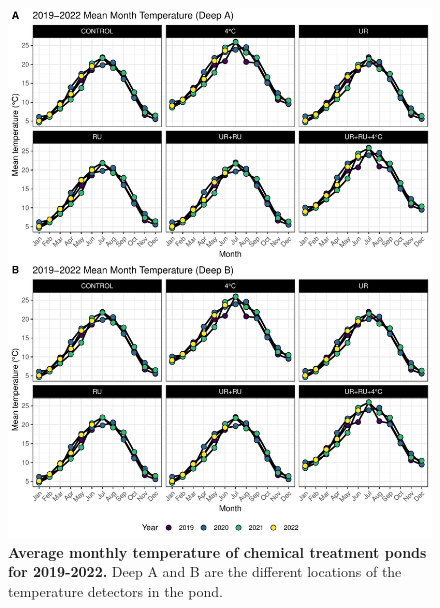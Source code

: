 \begin{figure}[H]
    \centering
    \includegraphics[scale=0.85]{./Figures/Temperature/Mean_month_temp_chem}
    \caption{\textbf{Average monthly temperature of chemical treatment ponds for 2019-2022.} Deep A and B are the different locations of the temperature detectors in the pond.}
    \label{fig:mean_m_temp_chem}
\end{figure}

